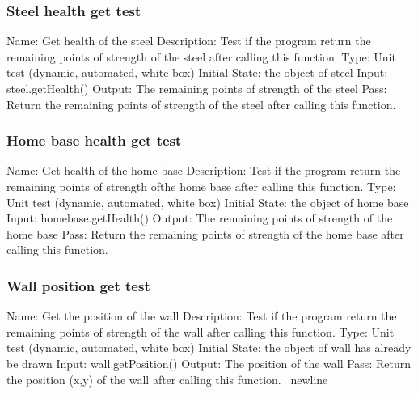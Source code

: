 \documentclass{article}
\begin{document}
\subsubsection{Steel health get test}
Name:  Get health of the steel\newline
Description: Test if the program return the remaining points of strength of 
the steel after calling this function. \newline
Type: Unit test (dynamic, automated, white box) \newline
Initial State:  the object of steel\newline
Input: steel.getHealth()\newline
Output: The remaining points of strength of the steel\newline
Pass:  Return the remaining points of strength of the steel after calling this 
function. \newline

\subsubsection{Home base health get test}
Name:  Get health of the home base\newline
Description: Test if the program return the remaining points of strength ofthe
 home base after calling this function. \newline
Type: Unit test (dynamic, automated, white box) \newline
Initial State:  the object of home base\newline
Input: homebase.getHealth()\newline
Output: The remaining points of strength of the home base\newline
Pass:  Return the remaining points of strength of the home base after calling 
this function. \newline

\subsubsection{Wall position get test}
Name:  Get the position of the wall\newline
Description: Test if the program return the remaining points of strength of 
the wall after calling this function. \newline
Type: Unit test (dynamic, automated, white box) \newline
Initial State:  the object of wall has already be drawn\newline
Input: wall.getPosition()\newline
Output: The position of the wall\newline
Pass:  Return the position (x,y) of the wall after calling this function. \
newline
\end{document}
